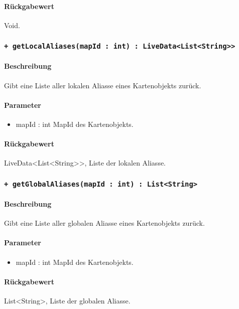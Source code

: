 \paragraph*{Rückgabewert}
Void.

\subsubsection*{\texttt{+ getLocalAliases(mapId : int) : LiveData<List<String>>}}%
\paragraph*{Beschreibung}
Gibt eine Liste aller lokalen Aliasse eines Kartenobjekts zurück.
\paragraph*{Parameter}
\begin{itemize}
    \item mapId : int MapId des Kartenobjekts.
\end{itemize}
\paragraph*{Rückgabewert}
LiveData<List<String>>, Liste der lokalen Aliasse.

\subsubsection*{\texttt{+ getGlobalAliases(mapId : int) : List<String>}}%
\paragraph*{Beschreibung}
Gibt eine Liste aller globalen Aliasse eines Kartenobjekts zurück. 
\paragraph*{Parameter}
\begin{itemize}
    \item mapId : int MapId des Kartenobjekts.
\end{itemize}
\paragraph*{Rückgabewert}
List<String>, Liste der globalen Aliasse.
